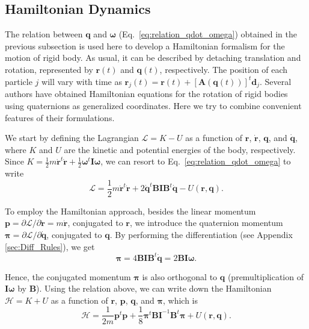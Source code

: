 \documentclass[aip,jcp,reprint,amsmath,amssymb,amsfont]{revtex4-1}
\newcommand{\mt}[1]{\boldsymbol{\mathbf{#1}}}           %
\newcommand{\vt}[1]{\boldsymbol{\mathbf{#1}}}           %
\newcommand{\tr}[1]{#1^t}                               %
\begin{document}
\subsection{Hamiltonian Dynamics}
\label{sec:hamiltonian}

The relation between $\vt q$ and $\vt \omega$ (Eq.~\ref{eq:relation_qdot_omega}) obtained in the previous subsection is used here to develop a Hamiltonian formalism for the motion of rigid body. As usual, it can be described by detaching translation and rotation, represented by ${\vt r}(t)$ and ${\vt q}(t)$, respectively. The position of each particle $j$ will vary with time as $\vt r_j(t) = \vt r(t) + \tr{[{\mt A}(\vt q(t))]}\vt d_j$. Several authors have obtained Hamiltonian equations for the rotation of rigid bodies using quaternions as generalized coordinates.\cite{Maciejewski1985, Dichmann1996, Miller2002, Ravishankar2004, Nielsen2012} Here we try to combine convenient features of their formulations.

We start by defining the Lagrangian $\mathcal{L} = K - U$ as a function of $\vt r$, $\dot{\vt r}$, $\vt q$, and $\dot{\vt q}$, where $K$ and $U$ are the kinetic and potential energies of the body, respectively. Since $K = \frac{1}{2} m \tr{\dot{\vt r}} \dot{\vt r} + \frac{1}{2} \tr{\vt \omega} \mt I \vt \omega$,\cite{Goldstein2002} we can resort to Eq.~\ref{eq:relation_qdot_omega} to write
\[
\mathcal{L} = \frac{1}{2} m \tr{\dot{\vt r}} \dot{\vt r} + 2 \tr{\dot{\vt q}} \mt B \mt I \tr{\mt B} \dot{\vt q} - U(\vt r, \vt q).
\]

To employ the Hamiltonian approach, besides the linear momentum $\vt p = \partial \mathcal{L}/\partial \dot{\vt r} = m \dot{\vt r}$, conjugated to $\vt r$, we introduce the quaternion momentum $\vt \pi = \partial \mathcal{L}/\partial \dot{\vt q}$, conjugated to $\vt q$.\citep{Goldstein2002} By performing the differentiation (see Appendix \ref{sec:Diff_Rules}), we get
\begin{equation}
\label{eq:conj_momentum}
\vt \pi = 4 \mt B \mt I \tr{\mt B} \dot{\vt q} = 2 \mt B \mt I \vt \omega.
\end{equation}

Hence, the conjugated momentum $\vt \pi$ is also orthogonal to $\vt q$ (premultiplication of $\mt I \vt \omega$ by $\mt B$). Using the relation above, we can write down the Hamiltonian $\mathcal{H} = K + U$ as a function of $\vt r$, $\vt p$, $\vt q$, and $\vt \pi$, which is
\begin{equation}
\label{eq:H_with_B}
\mathcal{H} = \frac{1}{2m} \tr{\vt p} \vt p + \frac{1}{8} \tr{\vt \pi} {\mt B} {\mt I}^{-1} \tr{\mt B} \vt \pi + U(\vt r, \vt q).
\end{equation}
\end{document}
